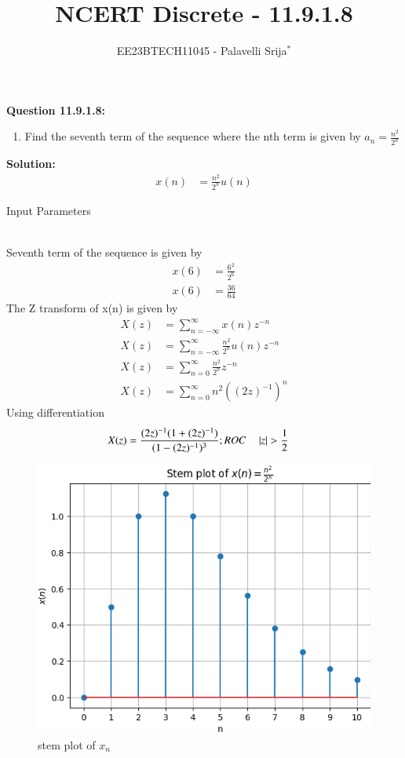 \documentclass[journal,12pt,twocolumn]{IEEEtran}
\theoremstyle{remark}
\begin{document}

\vspace{3cm}

\title{NCERT Discrete - 11.9.1.8}
\author{EE23BTECH11045 - Palavelli Srija$^{*}$%
}
\maketitle
\newpage
\bigskip

\renewcommand{\thefigure}{\theenumi}
\renewcommand{\thetable}{\theenumi}

\vspace{3cm}
\textbf{Question 11.9.1.8:} 
\begin{enumerate}
\item Find the seventh term of the sequence where the nth term is given by $a_n= \frac {n^2}{2^{n}}$

\end{enumerate}
\textbf{Solution: }
\begin{align}
 x(n) &= \frac{n^2}{2^{n}}u(n)
\end{align}
\begin{table}[h!]
    \centering
    
    \caption{Input Parameters}
    \label{tab:table1}
   \end{table}
\\Seventh term of the sequence is given by
\begin{align}
x(6) &= \frac {6^2}{2^6}\\
x(6) &= \frac {36}{64}
\end{align}
The Z transform of x(n) is given by
\begin{align}
X(z) &= \sum_{n=-\infty}^{\infty} x(n)z^{-n}\\
X(z) &= \sum_{n=-\infty}^{\infty} \frac {n^2}{2^{n}}u(n)z^{-n}\\
X(z) &= \sum_{n=0}^{\infty} \frac {n^2}{2^{n}}z^{-n}\\
X(z) &=  \sum_{n=0}^{\infty} n^2 ((2z)^{-1})^{n}
\end{align}
Using differentiation
\begin{align}
X(z) &=  \frac {(2z)^{-1}(1+(2z)^{-1})}{(1-(2z)^{-1})^{3}}; ROC \quad \left\vert z\right\vert > \frac{1}{2}
\end{align}
\begin{figure}[h!]
    \centering
    \includegraphics[width=\columnwidth]{figs/plot.png}
    \caption{stem plot of $x_n$}
    \label{fig:1}
\end{figure}
\end{document}

